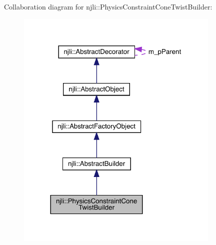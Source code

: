 Collaboration diagram for njli\+:\+:Physics\+Constraint\+Cone\+Twist\+Builder\+:\nopagebreak
\begin{figure}[H]
\begin{center}
\leavevmode
\includegraphics[width=276pt]{classnjli_1_1_physics_constraint_cone_twist_builder__coll__graph}
\end{center}
\end{figure}

